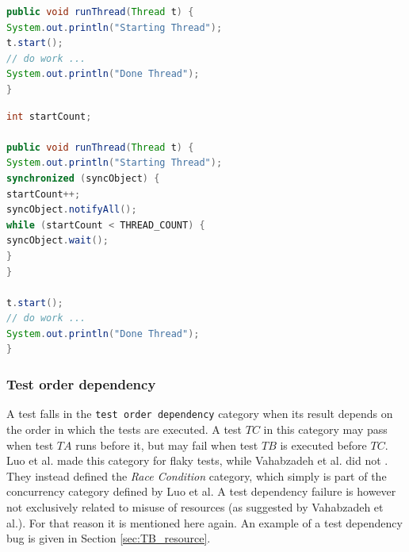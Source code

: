 \documentclass{uvamscse}
\newcommand{\Atestbugs}{Vahabzadeh et al.}
\newcommand{\Aflaky}{Luo et al.}
\begin{document}
\begin{lstlisting}[language=java, caption=concurrency TB, label=Code_TB_Concurrency]
public void runThread(Thread t) {
System.out.println("Starting Thread");
t.start();
// do work ...
System.out.println("Done Thread");
}
\end{lstlisting}

\begin{lstlisting}[language=java, caption=concurrency TB fix, label=Code_TB_Concurrency_fix]
int startCount;

public void runThread(Thread t) {
System.out.println("Starting Thread");
synchronized (syncObject) {
startCount++;
syncObject.notifyAll();
while (startCount < THREAD_COUNT) {
syncObject.wait();	
}
}

t.start();
// do work ...
System.out.println("Done Thread");
}
\end{lstlisting}

\subsubsection{Test order dependency}
A test falls in the \texttt{test order dependency} category when its result depends on the order in which the tests are executed. A test $TC$ in this category may pass when test $TA$ runs before it, but may fail when test $TB$ is executed before $TC$. \Aflaky{} made this category for flaky tests, while \Atestbugs{} did not \cite{vahabzadeh2015empirical, 2014empirical}. They instead defined the \emph{Race Condition} category, which simply is part of the concurrency category defined by \Aflaky{} A test dependency failure is however not exclusively related to misuse of resources (as suggested by \Atestbugs). For that reason it is mentioned here again. An example of a test dependency bug is given in Section \ref{sec:TB_resource}. 
\end{document}
